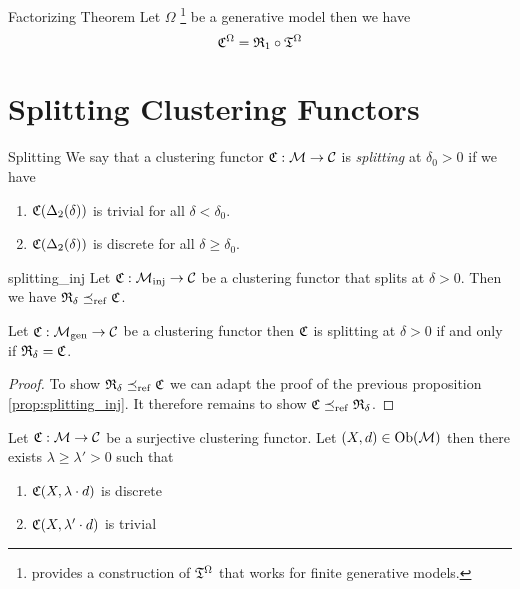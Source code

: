 \begin{theorem}{Factorizing Theorem}{}
Let $\Omega$ \footnote{\cite{Carlsson2010} provides a construction of $\mathfrak{T}^\Omega$ that works for finite generative models.} be a generative model then we have
\begin{equation*}
\mathfrak{C}^\Omega = \mathfrak{R}_1 \circ \mathfrak{T}^\Omega
\end{equation*}
\end{theorem}

\section{Splitting Clustering Functors}

\begin{definition}{Splitting}{}
We say that a clustering functor $\mathfrak{C}: \mathcal{M} \to \mathcal{C}$ is \emph{splitting} at $\delta_0 > 0$ if we have

\begin{enumerate}
    \item $\mathfrak{C}(\Delta_2(\delta))$ is trivial for all $\delta < \delta_0$.
    \item $\mathfrak{C}(\Delta_2(\delta))$ is discrete for all $\delta \geq \delta_0$.
\end{enumerate}

\end{definition}

\begin{proposition}{}{splitting_inj}
Let $\mathfrak{C}: {\mathcal{M}_\mathrm{inj}} \to \mathcal{C}$ be a clustering functor that splits at $\delta > 0$. Then we have $\mathfrak{R}_\delta \preceq_\mathrm{ref} \mathfrak{C}$.
\end{proposition}

\begin{proposition}{}{}
Let $\mathfrak{C}: {\mathcal{M}_\mathrm{gen}} \to \mathcal{C}$ be a clustering functor then $\mathfrak{C}$ is splitting at $\delta > 0$ if and only if $\mathfrak{R}_\delta = \mathfrak{C}$.
\end{proposition}

\begin{proof}
To show $\mathfrak{R}_\delta \preceq_\mathrm{ref} \mathfrak{C}$ we can adapt the proof of the previous proposition \ref{prop:splitting_inj}. It therefore remains to show $\mathfrak{C} \preceq_\mathrm{ref} \mathfrak{R}_\delta$. \todo
\end{proof}

\begin{lemma}{}{}
\newresult
Let $\mathfrak{C}: \mathcal{M} \to \mathcal{C}$ be a surjective clustering functor. Let $(X,d) \in \mathrm {Ob}(\mathcal{M})$ then there exists $\lambda \geq \lambda' > 0$ such that
\begin{enumerate}
    \item $\mathfrak{C}(X, \lambda \cdot d)$ is discrete
    \item $\mathfrak{C}(X, \lambda' \cdot d)$ is trivial
\end{enumerate}
\end{lemma}

